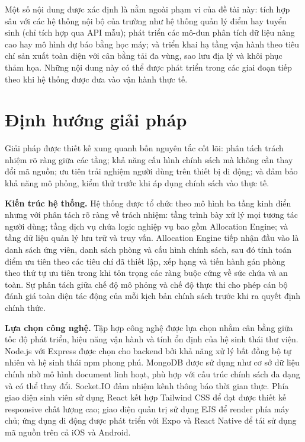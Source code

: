 \documentclass[a4paper,12pt,openany,oneside]{report}
\begin{document}
Một số nội dung được xác định là nằm ngoài phạm vi của đề tài này: tích hợp
sâu với các hệ thống nội bộ của trường như hệ thống quản lý điểm hay tuyển sinh
(chỉ tích hợp qua API mẫu); phát triển các mô-đun phân tích dữ liệu nâng cao
hay mô hình dự báo bằng học máy; và triển khai hạ tầng vận hành theo tiêu chí
sản xuất toàn diện với cân bằng tải đa vùng, sao lưu địa lý và khôi phục thảm
họa. Những nội dung này có thể được phát triển trong các giai đoạn tiếp theo khi
hệ thống được đưa vào vận hành thực tế.

\section{Định hướng giải pháp}

Giải pháp được thiết kế xung quanh bốn nguyên tắc cốt lõi: phân tách trách
nhiệm rõ ràng giữa các tầng; khả năng cấu hình chính sách mà không cần thay
đổi mã nguồn; ưu tiên trải nghiệm người dùng trên thiết bị di động; và đảm bảo
khả năng mô phỏng, kiểm thử trước khi áp dụng chính sách vào thực tế.

\textbf{Kiến trúc hệ thống.} Hệ thống được tổ chức theo mô hình ba tầng kinh
điển nhưng với phân tách rõ ràng về trách nhiệm: tầng trình bày xử lý mọi tương
tác người dùng; tầng dịch vụ chứa logic nghiệp vụ bao gồm Allocation Engine; và
tầng dữ liệu quản lý lưu trữ và truy vấn. Allocation Engine tiếp nhận đầu vào
là danh sách ứng viên, danh sách phòng và cấu hình chính sách, sau đó tính toán
điểm ưu tiên theo các tiêu chí đã thiết lập, xếp hạng và tiến hành gán phòng
theo thứ tự ưu tiên trong khi tôn trọng các ràng buộc cứng về sức chứa và an
toàn. Sự phân tách giữa chế độ mô phỏng và chế độ thực thi cho phép cán bộ
đánh giá toàn diện tác động của mỗi kịch bản chính sách trước khi ra quyết định
chính thức.

\textbf{Lựa chọn công nghệ.} Tập hợp công nghệ được lựa chọn nhằm cân bằng
giữa tốc độ phát triển, hiệu năng vận hành và tính ổn định của hệ sinh thái thư
viện. Node.js với Express được chọn cho backend bởi khả năng xử lý bất đồng bộ
tự nhiên và hệ sinh thái npm phong phú. MongoDB được sử dụng như cơ sở dữ liệu
chính nhờ mô hình document linh hoạt, phù hợp với cấu trúc chính sách đa dạng
và có thể thay đổi. Socket.IO đảm nhiệm kênh thông báo thời gian thực. Phía
giao diện sinh viên sử dụng React kết hợp Tailwind CSS để đạt được thiết kế
responsive chất lượng cao; giao diện quản trị sử dụng EJS để render phía máy
chủ; ứng dụng di động được phát triển với Expo và React Native để tái sử dụng
mã nguồn trên cả iOS và Android.
\end{document}
